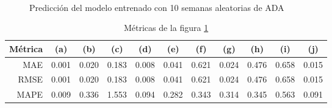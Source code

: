 \documentclass[a4paper,10pt]{article}
\begin{document}
\begin{figure}[H]
    \\
  \caption{Predicción del modelo entrenado con 10 semanas aleatorias de ADA}
  \label{f:ada_wk_prophet}
\end{figure}

\begin{table}[H]
 \begin{center}
 \resizebox{12cm}{!} {
  \begin{tabular}{|r|c|c|c|c|c|c|c|c|c|c|}
    Métrica & (a) & (b) & (c) & (d) & (e) & (f) & (g) & (h) & (i) & (j) \\ \hline
    MAE & 0.001 & 0.020 & 0.183 & 0.008 & 0.041 & 0.621 & 0.024 & 0.476 & 0.658 & 0.015 \\
    RMSE & 0.001 & 0.020 & 0.183 & 0.008 & 0.041 & 0.621 & 0.024 & 0.476 & 0.658 & 0.015 \\
    MAPE & 0.009 & 0.336 & 1.553 & 0.094 & 0.282 & 0.343 & 0.314 & 0.345 & 0.563 & 0.091 \\ \hline
  \end{tabular}
  }
  \caption{Métricas de la figura \ref{f:ada_wk_prophet}}
  \label{tab:ada_prophet_wk}
 \end{center}
\end{table}
\end{document}
